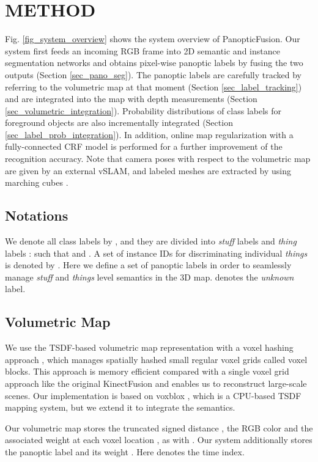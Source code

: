\documentclass[letterpaper, 10pt, conference]{latex_template/ieeeconf}
\begin{document}
\section{METHOD}
Fig. \ref{fig_system_overview} shows the system overview of PanopticFusion.
Our system first feeds an incoming RGB frame into 2D semantic and instance segmentation networks and obtains pixel-wise panoptic labels by fusing the two outputs (Section \ref{sec_pano_seg}).
The panoptic labels are carefully tracked by referring to the volumetric map at that moment (Section \ref{sec_label_tracking}) and are integrated into the map with depth measurements (Section \ref{sec_volumetric_integration}).
Probability distributions of class labels for foreground objects are also incrementally integrated (Section \ref{sec_label_prob_integration}).
In addition, online map regularization with a fully-connected CRF model is performed for a further improvement of the recognition accuracy.
Note that camera poses with respect to the volumetric map are given by an external vSLAM, and labeled meshes are extracted by using marching cubes \cite{lorensen1987marching}.


\subsection{Notations}
We denote all class labels by , and they are divided into {\it stuff} labels  and {\it thing} labels :
such that  and .
A set of instance IDs for discriminating individual {\it things} is denoted by .
Here we define a set of panoptic labels  in order to seamlessly manage {\it stuff} and {\it things} level semantics in the 3D map.
 denotes the {\it unknown} label.

\subsection{Volumetric Map}
We use the TSDF-based volumetric map representation with a voxel hashing approach \cite{niessner2013real}, which manages spatially hashed small regular voxel grids called voxel blocks. 
This approach is memory efficient compared with a single voxel grid approach like the original KinectFusion \cite{newcombe2011kinectfusion} and enables us to reconstruct large-scale scenes.
Our implementation is based on voxblox \cite{oleynikova2017voxblox}, which is a CPU-based TSDF mapping system, but we extend it to integrate the semantics. 

Our volumetric map stores the truncated signed distance , the RGB color  and the associated weight  at each voxel location , as with \cite{newcombe2011kinectfusion}.
Our system additionally stores the panoptic label  and its weight .
Here  denotes the time index.
\end{document}
